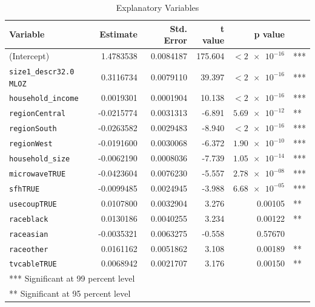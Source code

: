 \documentclass[11pt, fleqn]{article}
\begin{document}
\begin{table}
\centering
  \begin{tabular}{l r r r r l}
    \toprule
    Variable & Estimate  & Std. Error &  t value  & p value & \\
    \midrule
    (Intercept) & 1.4783538 & 0.0084187 & 175.604 & $<\num{2e-16}$ & ***\\
    \texttt{size1\_descr32.0 MLOZ} & 0.3116734 & 0.0079110 & 39.397 & $<\num{2e-16}$ & *** \\
    \texttt{household\_income} & 0.0019301 & 0.0001904 & 10.138 & $<\num{2e-16}$ & *** \\
    \texttt{regionCentral} & -0.0215774 & 0.0031313 & -6.891 & $\num{5.69e-12}$ & ** \\
    \texttt{regionSouth} & -0.0263582 & 0.0029483 & -8.940 & $<\num{2e-16}$ & *** \\
    \texttt{regionWest} & -0.0191600 & 0.0030068 & -6.372 & $\num{1.90e-10}$ & *** \\
    \texttt{household\_size} & -0.0062190 & 0.0008036 & -7.739 & $\num{1.05e-14}$ & *** \\
    \texttt{microwaveTRUE} & -0.0423604 & 0.0076230 & -5.557 & $\num{2.78e-08}$ & *** \\
    \texttt{sfhTRUE} & -0.0099485 & 0.0024945 & -3.988 & $\num{6.68e-05}$ & *** \\
    \texttt{usecoupTRUE} & 0.0107800 & 0.0032904 & 3.276 & 0.00105 & **  \\
    \texttt{raceblack} & 0.0130186 & 0.0040255 & 3.234 & 0.00122 & **  \\
    \texttt{raceasian} & -0.0035321 & 0.0063275 & -0.558 & 0.57670 & \\
    \texttt{raceother} & 0.0161162 & 0.0051862 & 3.108 & 0.00189 & **  \\
    \texttt{tvcableTRUE} & 0.0068942 & 0.0021707 & 3.176 & 0.00150 & **  \\
    \midrule
    \multicolumn{6}{l}{*** Significant at 99 percent level}\\
    \multicolumn{6}{l}{** Significant at 95 percent level}\\
    \bottomrule
  \end{tabular}
  \caption{Explanatory Variables}
  \label{tab:regress}
\end{table}
\end{document}
